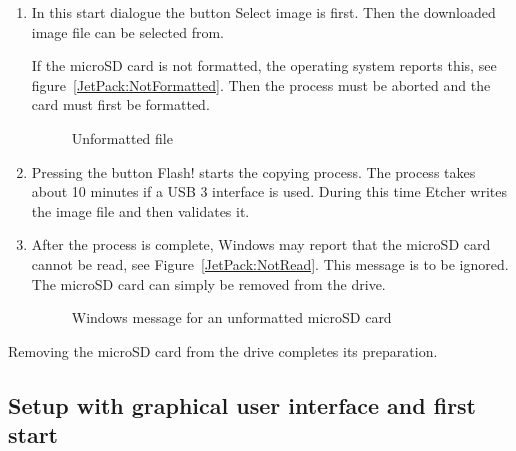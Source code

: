 \begin{enumerate}
\begin{itemize}
\begin{enumerate}
			\item In this start dialogue the button \glqq Select image\grqq{} is first. Then the downloaded image file can be selected from.
            
            If the microSD card is not formatted, the operating system reports this, see figure~\ref{JetPack:NotFormatted}. Then the process must be aborted and the card must first be formatted.

            \begin{figure}
              \centering

              
              \caption{Unformatted file}\label{JetPack:NichtFormatiert}
            \end{figure}			
			
			\item Pressing the button \glqq Flash!\grqq{} starts the copying process. The process takes about 10 minutes if a USB 3 interface is used. During this time Etcher writes the image file and then validates it.
			\item  After the process is complete, Windows may report that the microSD card cannot be read, see Figure~\ref{JetPack:NotRead}. This message is to be ignored. The microSD card can simply be removed from the drive. 
			
			\begin{figure}
				\centering
			
	 
	            \caption{Windows message for an unformatted microSD card}\label{JetPack:NichtLesen}		
			\end{figure}
			
		\end{enumerate}
		
	\end{itemize}
\end{enumerate}  

Removing the microSD card from the drive completes its preparation. 


\subsection{Setup with graphical user interface and first start}

